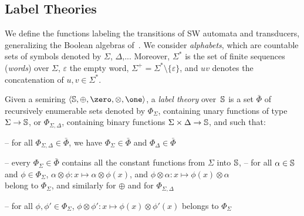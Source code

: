 %
%
\subsection{Label Theories} 
We define the functions labeling the transitions of SW automata and transducers,
generalizing the Boolean algebras of~\cite{dAntoniVeanes17CAV}.
%
We consider \emph{alphabets}, which are countable 
sets of symbols
denoted by $\Sigma$, $\Delta$,...
Moreover, $\Sigma^*$ is the set of finite sequences (\emph{words}) over
$\Sigma$, $\varepsilon$ the empty word, $\Sigma^+ = \Sigma^* \setminus \{ \varepsilon \}$,
and $u v$ denotes the concatenation of $u, v \in \Sigma^*$.

Given a semiring $\< \Semiring, \oplus, \zero, \otimes, \one>$,
a \emph{label theory} over~$\mathbb{S}$
is a set $\bar\Phi$ of recursively enumerable sets denoted by
$\Phi_\Sigma$, %
containing unary functions of type $\Sigma \to \mathbb{S}$, %
or $\Phi_{\Sigma, \Delta}$, containing binary functions $\Sigma \times \Delta \to \mathbb{S}$,
and such that:

\noindent --
for all $\Phi_{\Sigma, \Delta} \in \bar\Phi$, we have
$\Phi_{\Sigma} \in \bar\Phi$ and $\Phi_{\Delta} \in \bar\Phi$

\noindent --
every $\Phi_{\Sigma}\in \bar\Phi$ contains all the constant functions from $\Sigma$ into $\mathbb{S}$,
\noindent --
for all $\alpha \in \mathbb{S}$ and $\phi \in \Phi_\Sigma$,
      $\alpha \otimes \phi : x \mapsto \alpha \otimes \phi(x)$,
      and $\phi \otimes \alpha : x \mapsto \phi(x) \otimes \alpha$\\
\phantom{--} belong to $\Phi_\Sigma$, and similarly for $\oplus$
      and for $\Phi_{\Sigma, \Delta}$

\noindent --
for all $\phi, \phi' \in \Phi_\Sigma$,
$\phi \otimes \phi': x \mapsto \phi(x) \otimes \phi'(x)$ belongs to $\Phi_\Sigma$

